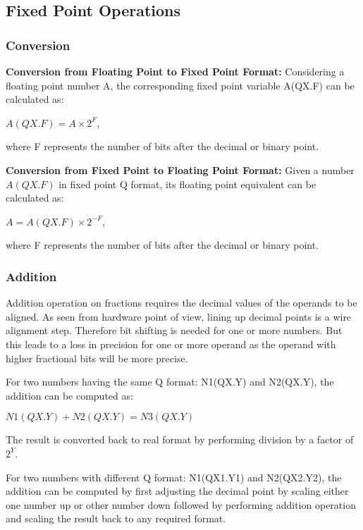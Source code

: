 \subsection{Fixed Point Operations} \label{2.5.3}
\subsubsection{Conversion}
\textbf{Conversion from Floating Point  to Fixed  Point Format:}
Considering a floating point number A, the corresponding fixed point variable A(QX.F) can be calculated as:

\hspace{3cm}$A(QX.F)=A\times 2^{F}$,

\noindent where F represents the number of bits after the decimal or binary point.

\noindent \textbf{Conversion from Fixed Point  to Floating  Point Format:}
Given a number $A(QX.F)$ in fixed point Q format, its floating point equivalent can be calculated as:

\hspace{3cm}$A=A(QX.F)\times 2^{-F}$,

\noindent where F represents the number of bits after the decimal or binary point.


\subsubsection{Addition}
Addition operation on fractions requires the decimal values of the operands to be aligned. As seen from hardware point of view, lining up decimal points is a wire alignment step. Therefore bit shifting is needed for one or more numbers. But this leads to a loss in precision for one or more operand as the operand with higher fractional bits will be more precise. 

\vspace{0.25cm}
\noindent For two numbers having the same Q format: N1(QX.Y) and N2(QX.Y), the addition can be computed as:

\hspace{3cm}
$N1(QX.Y)+N2(QX.Y)= N3(QX.Y)$

\noindent The result is converted back to real format by performing division by a factor of $2^{Y}$.

\vspace{0.25cm}
\noindent For two numbers with different Q format: N1(QX1.Y1) and N2(QX2.Y2), the addition can be computed by first adjusting the decimal point by scaling either one number up or other number down followed by performing addition operation and scaling the result back to any required format.

